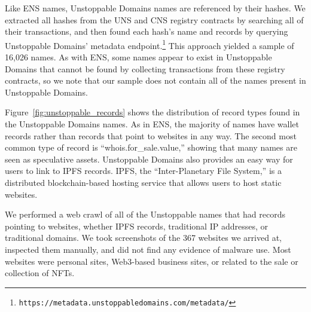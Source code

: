 Like ENS names, Unstoppable Domains names are referenced by their hashes. We 
extracted all hashes from the UNS and CNS registry contracts 
by searching all of their transactions, and then found each 
hash's name and records by querying Unstoppable Domains' 
metadata endpoint.\footnote{	
\texttt{https://metadata.unstoppabledomains.com/metadata/}} 
This approach yielded a sample of 16,026 names. As with ENS, 
some names appear to exist in Unstoppable Domains that cannot 
be found by collecting transactions from these registry 
contracts, so we note that our sample does not contain all of 
the names present in Unstoppable Domains.


Figure~\ref{fig:unstoppable_records} shows the distribution 
of record types found in the Unstoppable Domains names. As in 
ENS, the majority of names have wallet records rather than 
records that point to websites in any way. The second most common 
type of record is ``whois.for\_sale.value,'' showing that many 
names are seen as speculative assets. Unstoppable Domains also 
provides an easy way for users to link to IPFS records. IPFS, 
the ``Inter-Planetary File System,'' is a distributed 
blockchain-based hosting service that allows users to host 
static websites.

We performed a web crawl of all of the Unstoppable names that 
had records pointing to websites, whether IPFS records, 
traditional IP addresses, or traditional domains. We took 
screenshots of the 367 websites we arrived 
at, inspected them manually, and did not find any evidence of 
malware use. Most 
websites were personal sites, Web3-based business sites, or related to the sale 
or collection of NFTs. 




